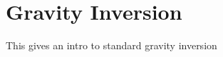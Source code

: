 \chapter{Gravity Inversion}\label{Chp:cook:gravity inversion}

This gives an intro to standard gravity inversion